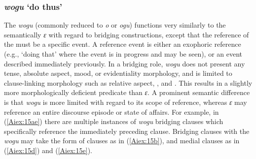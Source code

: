 \documentclass[output=paper]{LSP/langsci}
\begin{document}
\subsubsection{\textit{wogu} `do thus'} 
\label{Aidemonverb.wogu}
The  \textit{wogu} (commonly reduced to \textit{o} or \textit{ogu}) functions very similarly to the semantically  \textit{ɛ} with regard to bridging constructions, except that the reference of the  must be a specific event. A reference event is either an exophoric reference (e.g., `doing that' where the event is in progress and may be seen), or an event described immediately previously. In a bridging role, \textit{wogu} does not present any tense, absolute aspect, mood, or evidentiality morphology, and is limited to clause-linking morphology such as relative aspect, , and . This results in a slightly more morphologically deficient predicate than \textit{ɛ}. A prominent semantic difference is that \textit{wogu} is more limited with regard to its scope of reference, whereas \textit{ɛ} may reference an entire discourse episode or state of affairs. For example, in (\ref{Aiex:15ae}) there are multiple instances of \textit{wogu} bridging clauses which specifically reference the immediately preceding clause. Bridging clauses with the  \textit{wogu} may take the form of  clauses as in (\ref{Aiex:15b}), and medial clauses as in (\ref{Aiex:15d}) and (\ref{Aiex:15e}).
\end{document}
